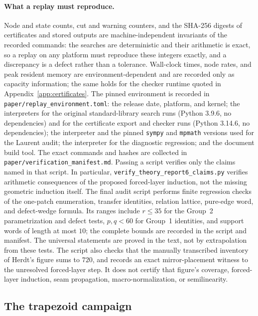 \documentclass[11pt]{amsart}
\theoremstyle{definition}
\theoremstyle{remark}
\newcommand{\pathcode}[1]{\nolinkurl{#1}}
\begin{document}
\paragraph{What a replay must reproduce.}
Node and state counts, cut and warning counters, and the SHA-256 digests of
certificates and stored outputs are machine-independent invariants of the
recorded commands: the searches are deterministic and their arithmetic is
exact, so a replay on any platform must reproduce these integers exactly, and
a discrepancy is a defect rather than a tolerance.  Wall-clock times, node
rates, and peak resident memory are environment-dependent and are recorded
only as capacity information; the same holds for the checker runtime quoted
in Appendix~\ref{app:certificates}.  The pinned environment is recorded in
\pathcode{paper/replay_environment.toml}: the release date, platform, and
kernel; the interpreters for the original standard-library search runs
(Python 3.9.6, no dependencies) and for the certificate export and checker
runs (Python 3.14.6, no dependencies); the interpreter and the pinned
\texttt{sympy} and \texttt{mpmath} versions used for the Laurent audit; the
interpreter for the diagnostic regression; and the document build tool.
The exact commands and hashes are collected in
\pathcode{paper/verification_manifest.md}.  Passing a script verifies only
the claims named in that script.  In
particular, \pathcode{verify_theory_report6_claims.py} verifies arithmetic
consequences of the proposed forced-layer induction, not the missing geometric
induction itself.  The final audit script performs finite regression checks of
the one-patch enumeration, transfer identities, relation lattice, pure-edge
word, and defect-wedge formula.  Its ranges include
$r\le35$ for the Group~2 parametrization and defect tests, $p,q<60$ for
Group~1 identities, and support words of length at most $10$; the complete
bounds are recorded in the script and manifest.  The universal statements are
proved in the text, not by extrapolation from these tests.  The script also
checks that the manually transcribed inventory of Herdt's figure sums to
$720$, and records an exact mirror-placement witness to the unresolved
forced-layer step.  It does not certify that figure's coverage, forced-layer induction,
seam propagation, macro-normalization, or semilinearity.

\subsection{The trapezoid campaign}\label{app:trapezoids}
\end{document}
